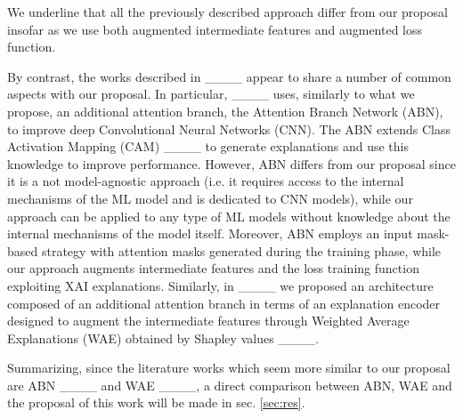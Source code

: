 We underline that all the previously described approach differ from our proposal insofar as we use both augmented intermediate features and augmented loss function.

By contrast, the works described in ____ appear to share a number of common aspects with our proposal.
In particular, ____ uses, similarly to what we propose, an additional attention branch, the Attention Branch Network (ABN), to improve deep Convolutional Neural Networks (CNN). The ABN extends Class Activation Mapping (CAM) ____ to generate explanations and use this knowledge to improve performance. However, ABN differs from our proposal since it is a not model-agnostic approach (i.e. it requires access to the internal mechanisms of the ML model and is dedicated to CNN models), while our approach can be applied to any type of ML models without knowledge about the internal mechanisms of the model itself. Moreover, ABN employs an input mask-based strategy with attention masks generated during the training phase, while our approach augments intermediate features and the loss training function exploiting XAI explanations. %
Similarly, in ____ we proposed an architecture composed of an additional attention branch in terms of an explanation encoder designed to augment the intermediate features through Weighted Average Explanations (WAE) obtained by Shapley values ____.

Summarizing, since the literature works which seem more similar to our proposal are ABN ____ and WAE ____, a direct comparison between ABN, WAE and the proposal of this work will be made in sec. \ref{sec:res}.

%
